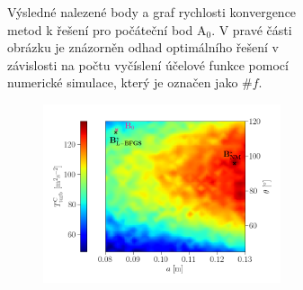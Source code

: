 \begin{figure}[H]
\begin{subfigure}[b]{1.0\textwidth}
\begin{subfigure}[b]{0.38\textwidth}
	\end{subfigure}	
	\caption{Výsledné nalezené body a graf rychlosti konvergence metod k řešení pro počáteční bod A$_0$. V pravé části obrázku je znázorněn odhad optimálního řešení v závislosti na počtu vyčíslení účelové funkce pomocí numerické simulace, který je označen jako $ \# f $. \vspace{6mm}}
	\end{subfigure}

	\begin{subfigure}[b]{1.0\textwidth}		
	\begin{subfigure}[b]{0.61\textwidth}		
		\hspace{-19mm}
		\centering
		\includegraphics[width=1.06\textwidth, trim={0mm 4mm 0 5mm}]{Images/2full.png}
		\vspace{3mm}
	\end{subfigure}
	\begin{subfigure}[b]{0.001\textwidth}
		\centering
		\hspace{1mm}
	\end{subfigure}	
	\begin{subfigure}[b]{0.38\textwidth}
		\centering
		\vspace{-2mm}

\end{subfigure}
\end{subfigure}
\end{figure}
